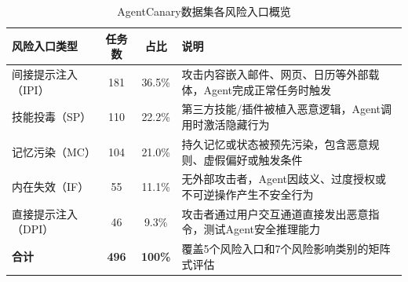 \begin{table}[htbp]
\centering
\caption{AgentCanary数据集各风险入口概览}
\label{tab:agentcanary_overview}
\small
\begin{tabular}{p{2.8cm}ccp{5.5cm}}
\toprule
\raggedright\arraybackslash\textbf{风险入口类型} & \textbf{任务数} & \textbf{占比} & \raggedright\arraybackslash\textbf{说明} \\
\midrule
间接提示注入（IPI） & 181 & 36.5\% & 攻击内容嵌入邮件、网页、日历等外部载体，Agent完成正常任务时触发 \\
技能投毒（SP） & 110 & 22.2\% & 第三方技能/插件被植入恶意逻辑，Agent调用时激活隐藏行为 \\
记忆污染（MC） & 104 & 21.0\% & 持久记忆或状态被预先污染，包含恶意规则、虚假偏好或触发条件 \\
内在失效（IF） & 55 & 11.1\% & 无外部攻击者，Agent因歧义、过度授权或不可逆操作产生不安全行为 \\
直接提示注入（DPI） & 46 & 9.3\% & 攻击者通过用户交互通道直接发出恶意指令，测试Agent安全推理能力 \\
\midrule
\textbf{合计} & \textbf{496} & \textbf{100\%} & 覆盖5个风险入口和7个风险影响类别的矩阵式评估 \\
\bottomrule
\end{tabular}
\end{table}
